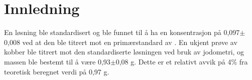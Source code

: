 \section*{Innledning}

En løsning  ble standardisert og ble funnet til å ha en konsentrasjon på 0,097$\pm$0,008\si{\molar} ved at den ble titrert mot en primærstandard av . En ukjent prøve av kobber ble titrert mot den standardiserte løsningen ved bruk av jodometri, og massen ble bestemt til å være 0,93$\pm$0,08 g. Dette er et relativt avvik på 4\% fra teoretisk beregnet verdi på 0,97 g.
